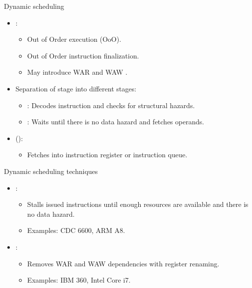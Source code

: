 \begin{frame}[t]{Dynamic scheduling}
\begin{itemize}
  \item {}:
    \begin{itemize}
      \item Out of Order execution (OoO).
      \item Out of Order instruction finalization.
      \item May introduce WAR and WAW .
    \end{itemize}

  \item Separation of  stage into   different stages:
    \begin{itemize}
      \item {}: 
            Decodes instruction and checks for structural hazards.
      \item {}: 
            Waits until there is no data hazard and fetches operands.
    \end{itemize}

  \item {} ():
    \begin{itemize}
      \item Fetches into instruction register or instruction queue.
    \end{itemize}
\end{itemize}
\end{frame}

\begin{frame}[t]{Dynamic scheduling techniques}
\begin{itemize}
  \item {}:
    \begin{itemize}
      \item Stalls issued instructions until enough resources are available and there is no data hazard.
      \item Examples: CDC 6600, ARM A8.
    \end{itemize}

  \item {}:
    \begin{itemize}
      \item Removes WAR and WAW dependencies with register renaming.
      \item Examples: IBM 360, Intel Core i7.
    \end{itemize}
\end{itemize}
\end{frame}
